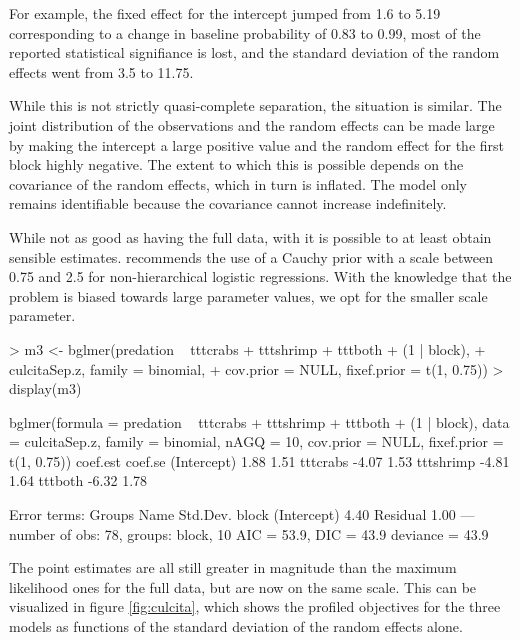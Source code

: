 \documentclass[article,shortnames]{jss}
\begin{document}
For example, the fixed effect for the intercept jumped from
1.6 to 5.19
corresponding to a change in baseline probability of 
0.83 to 
0.99, most of the reported statistical
signifiance is lost, and the standard deviation of the random effects
went from
3.5 to
11.75.

While this is not strictly quasi-complete separation, the
situation is similar. The joint distribution of the observations and the
random effects can be made large by making the intercept a large
positive value and the random effect for the first block highly
negative. The extent to which this is possible depends on the
covariance of the random effects, which in turn is inflated. The model
only remains identifiable because the covariance cannot increase indefinitely.

While not as good as having the full data, with  it is
possible to at least obtain sensible estimates. \citet{gelman:2008:weakly_informative} recommends the use
of a Cauchy prior with a scale between 0.75 and 2.5 for non-hierarchical logistic
regressions. With the knowledge that the problem is biased towards
large parameter values, we opt for the smaller scale parameter.

\begin{Schunk}
\begin{Sinput}
> m3 <- bglmer(predation ~ tttcrabs + tttshrimp + tttboth + (1 | block),
+              culcitaSep.z, family = binomial,
+              cov.prior = NULL, fixef.prior = t(1, 0.75))
> display(m3)
\end{Sinput}
\end{Schunk}

\begin{Schunk}
\begin{Soutput}
bglmer(formula = predation ~ tttcrabs + tttshrimp + tttboth + 
    (1 | block), data = culcitaSep.z, family = binomial, nAGQ = 10, 
    cov.prior = NULL, fixef.prior = t(1, 0.75))
            coef.est coef.se
(Intercept)  1.88     1.51  
tttcrabs    -4.07     1.53  
tttshrimp   -4.81     1.64  
tttboth     -6.32     1.78  

Error terms:
 Groups   Name        Std.Dev.
 block    (Intercept) 4.40    
 Residual             1.00    
---
number of obs: 78, groups: block, 10
AIC = 53.9, DIC = 43.9
deviance = 43.9 
\end{Soutput}
\end{Schunk}

The point estimates are all still greater in magnitude than the
maximum likelihood ones for the full data, but are now on the same
scale. This can be visualized in figure
\ref{fig:culcita}, which shows the profiled objectives for the three models as functions of the
standard deviation of the random effects alone.
\end{document}
